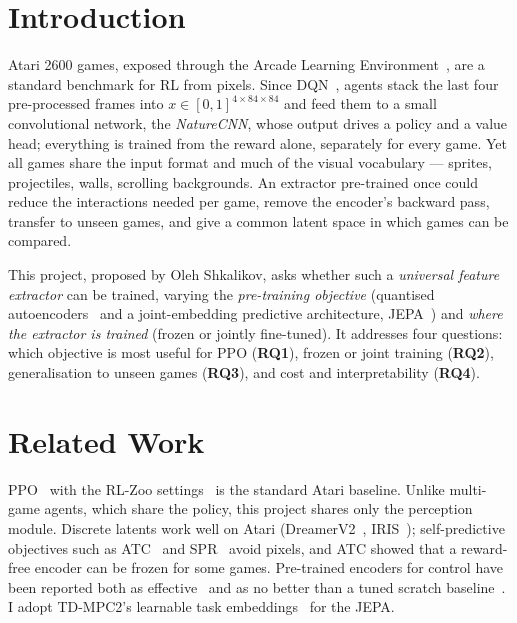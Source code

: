 \documentclass[runningheads]{llncs}
\begin{document}
\section{Introduction}
\label{sec:intro}

Atari 2600 games, exposed through the Arcade Learning Environment~\cite{machado2018revisiting},
are a standard benchmark for RL from pixels. Since DQN~\cite{mnih2015human}, agents stack
the last four pre-processed frames into $x\in[0,1]^{4\times84\times84}$ and feed them to a
small convolutional network, the \emph{NatureCNN}, whose output drives a policy and a value
head; everything is trained from the reward alone, separately for every game. Yet all games
share the input format and much of the visual vocabulary --- sprites, projectiles, walls,
scrolling backgrounds. An extractor pre-trained once could reduce the interactions needed per
game, remove the encoder's backward pass, transfer to unseen games, and give a common latent
space in which games can be compared.

This project, proposed by Oleh Shkalikov, asks whether such a \emph{universal feature
extractor} can be trained, varying the \emph{pre-training objective} (quantised
autoencoders~\cite{vandenoord2017vqvae,mentzer2024fsq} and a joint-embedding predictive
architecture, JEPA~\cite{lecun2022path,assran2023ijepa,bardes2024vjepa}) and \emph{where the
extractor is trained} (frozen or jointly fine-tuned). It addresses four questions: which
objective is most useful for PPO (\textbf{RQ1}), frozen or joint training (\textbf{RQ2}),
generalisation to unseen games (\textbf{RQ3}), and cost and interpretability (\textbf{RQ4}).

\section{Related Work}
\label{sec:related}

PPO~\cite{schulman2017ppo} with the RL-Zoo settings~\cite{raffin2020zoo} is the standard
Atari baseline. Unlike multi-game agents, which share the policy, this project shares only
the perception module. Discrete latents work well on Atari
(DreamerV2~\cite{hafner2021dreamerv2}, IRIS~\cite{micheli2023iris}); self-predictive objectives
such as ATC~\cite{stooke2021atc} and SPR~\cite{schwarzer2021spr} avoid pixels, and ATC showed
that a reward-free encoder can be frozen for some games. Pre-trained encoders for control have
been reported both as effective~\cite{parisi2022pvr} and as no better than a tuned scratch
baseline~\cite{hansen2022pretrained}. I adopt TD-MPC2's learnable task
embeddings~\cite{hansen2024tdmpc2} for the JEPA.
\end{document}
